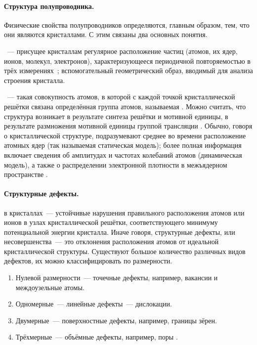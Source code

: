 \documentclass[a4paper, 14pt, titlepage]{extarticle}
\begin{document}
  \paragraph{Структура полупроводника.} Физические свойства полупроводников определяются, главным
  образом, тем, что они являются кристаллами. С этим связаны два основных понятия.

  ~--- присущее кристаллам регулярное расположение частиц (атомов, их
  ядер, ионов, молекул, электронов), характеризующееся периодичной повторяемостью в трёх
  измерениях~\cite{physenc-crystall}; вспомогательный геометрический образ, вводимый для анализа
  строения кристалла.

  ~--- такая совокупность атомов, в которой с каждой точкой
  кристаллической решётки связана определённая группа атомов, называемая . Можно считать,
  что структура возникает в результате синтеза решётки и мотивной единицы, в результате размножения
  мотивной единицы группой трансляции \cite{wiki-cryst-struct}.
  Обычно, говоря о кристаллической структуре, подразумевают среднее во времени расположение атомных
  ядер (так называемая статическая модель); более полная информация включает сведения об амплитудах и частотах
  колебаний атомов (динамическая модель), а также о распределении электронной плотности в межъядерном
  пространстве \cite{chemenc-crystall}.

  \paragraph{Структурные дефекты.}  в кристаллах~--- устойчивые нарушения правильного
  расположения атомов или ионов в узлах кристаллической решётки, соответствующего минимуму потенциальной
  энергии кристалла. Иначе говоря, структурные дефекты, или несовершенства~--- это отклонения
  расположения атомов от идеальной кристаллической структуры. Существуют большое количество
  различных видов дефектов, их можно классифицировать по размерности.
  \begin{enumerate}
    \item Нулевой размерности~--- точечные дефекты, например, вакансии и междоузельные атомы.
    \item Одномерные~--- линейные дефекты~--- дислокации.
    \item Двумерные~--- поверхностные дефекты, например, границы зёрен.
    \item Трёхмерные~--- объёмные дефекты, например, поры \cite{matare-defects}.
  \end{enumerate}
\end{document}
